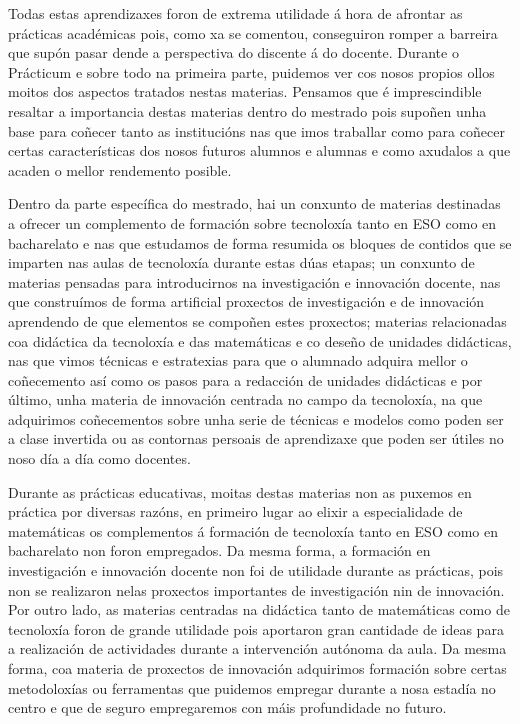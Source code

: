 Todas estas aprendizaxes foron de extrema utilidade á hora de afrontar as prácticas académicas pois, como xa se comentou, conseguiron romper a barreira que supón pasar dende a perspectiva do discente á do docente. Durante o Prácticum e sobre todo na primeira parte, puidemos ver cos nosos propios ollos moitos dos aspectos tratados nestas materias. Pensamos que é imprescindible resaltar a importancia destas materias dentro do mestrado pois supoñen unha base para coñecer tanto as institucións nas que imos traballar como para coñecer certas características dos nosos futuros alumnos e alumnas e como axudalos a que acaden o mellor rendemento posible.

Dentro da parte específica do mestrado, hai un conxunto de materias destinadas a ofrecer un complemento de formación sobre tecnoloxía tanto en ESO como en bacharelato e nas que estudamos de forma resumida os bloques de contidos que se imparten nas aulas de tecnoloxía durante estas dúas etapas; un conxunto de materias pensadas para introducirnos na investigación e innovación docente, nas que construímos de forma artificial proxectos de investigación e de innovación aprendendo de que elementos se compoñen estes proxectos; materias relacionadas coa didáctica da tecnoloxía e das matemáticas e co deseño de unidades didácticas, nas que vimos técnicas e estratexias para que o alumnado adquira mellor o coñecemento así como os pasos para a redacción de unidades didácticas e por último, unha materia de innovación centrada no campo da tecnoloxía, na que adquirimos coñecementos sobre unha serie de técnicas e modelos como poden ser a clase invertida ou as contornas persoais de aprendizaxe que poden ser útiles no noso día a día como docentes.

Durante as prácticas educativas, moitas destas materias non as puxemos en práctica por diversas razóns, en primeiro lugar ao elixir a especialidade de matemáticas os complementos á formación de tecnoloxía tanto en ESO como en bacharelato non foron empregados. Da mesma forma, a formación en investigación e innovación docente non foi de utilidade durante as prácticas, pois non se realizaron nelas proxectos importantes de investigación nin de innovación. Por outro lado, as materias centradas na didáctica tanto de matemáticas como de tecnoloxía foron de grande utilidade pois aportaron gran cantidade de ideas para a realización de actividades durante a intervención autónoma da aula. Da mesma forma, coa materia de proxectos de innovación adquirimos formación sobre certas metodoloxías ou ferramentas que puidemos empregar durante a nosa estadía no centro e que de seguro empregaremos con máis profundidade no futuro.

